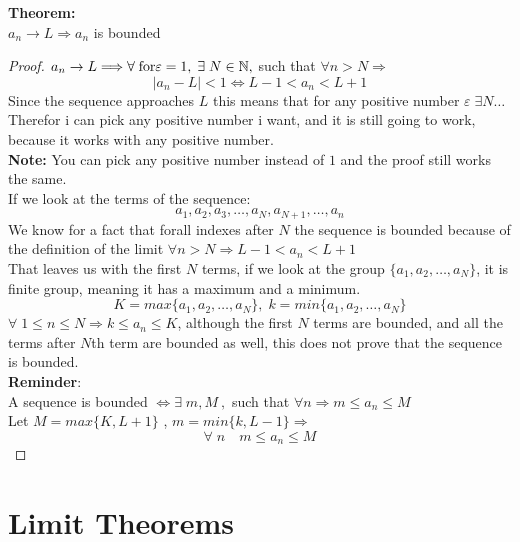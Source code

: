 \noindent\textbf{Theorem:}\\
$a_n\rightarrow L \Longrightarrow a_n$ is bounded\\
\begin{proof}
    $a_n\rightarrow L \Longrightarrow \forall\;\text{for} \varepsilon=1,\; \exists\; N\in \mathbb{N},$ such that $\forall n>N\Longrightarrow$
    \[
        |a_n-L|<1 \iff L-1<a_n<L+1
    \]
    Since the sequence approaches $L$ this means that for any positive number $\varepsilon\; \exists N\ldots$\\
    Therefor i can pick any positive number i want, and it is still going to work, because it works with any positive number.\\
    \textbf{Note:} You can pick any positive number instead of $1$ and the proof still works the same.\\
    If we look at the terms of the sequence:
    \[
        a_1,a_2,a_3,\ldots,a_N,a_{N+1},\ldots,a_n
    \]
    We know for a fact that forall indexes after $N$ the sequence is bounded because of the definition of the limit $\forall n>N\Longrightarrow L-1<a_n<L+1$\\
    That leaves us with the first $N$ terms, if we look at the group $\{a_1,a_2,\ldots,a_N\}$, it is finite group, meaning it has a maximum and a minimum.\\
    \[
        K=max\{a_1,a_2,\ldots,a_N\},\; k = min\{a_1,a_2,\ldots,a_N\}
    \]
    $\forall\; 1\leq n\leq N \Longrightarrow k\leq a_n\leq K$, although the first $N$ terms are bounded, and all the terms after $N$th term are bounded as well, this does not prove that the sequence is bounded.\\
    \textbf{Reminder}:\\
    A sequence is bounded $\iff \exists\; m,M\: ,$ such that $\forall n\Longrightarrow m\leq a_n\leq M$\\
    Let $M = max\{K,L+1\}$ , $m = min\{k,L-1\}\Longrightarrow$\\
    \[
    \forall\; n \quad m\leq a_n\leq M
    \]
\end{proof}


\section{Limit Theorems}
